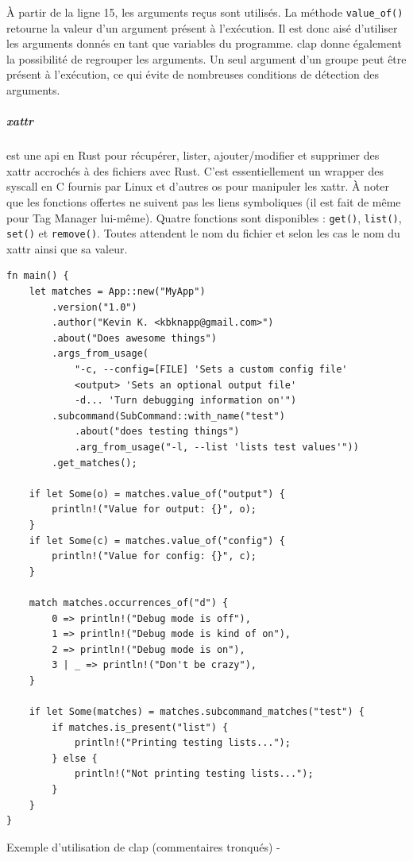 À partir de la ligne 15, les arguments reçus sont utilisés. La méthode \texttt{value_of()} 
retourne la valeur d'un argument présent à l'exécution. Il est donc aisé d'utiliser les arguments 
donnés en tant que variables du programme. clap donne également la possibilité de regrouper les 
arguments. Un seul argument d'un groupe peut être présent à l'exécution, ce qui évite de nombreuses 
conditions de détection des arguments.
\subparagraph{xattr}
est une \acrshort{api} 
en Rust pour récupérer, lister, ajouter/modifier et supprimer des \acrshort{xattr} accrochés à des 
fichiers avec Rust. C'est essentiellement un wrapper des \acrshort{syscall} en C fournis par Linux 
et d'autres \acrshort{os} pour manipuler les \acrshort{xattr}. À noter que les fonctions offertes ne 
suivent pas les liens symboliques (il est fait de même pour Tag Manager lui-même). Quatre fonctions 
sont disponibles : \texttt{get()}, \texttt{list()}, \texttt{set()} 
et \texttt{remove()}. Toutes attendent le nom du fichier et selon les cas le nom du 
\acrshort{xattr} ainsi que sa valeur.
\bigbreak
\begin{code}
    \begin{verbatim}
fn main() {
    let matches = App::new("MyApp")
        .version("1.0")
        .author("Kevin K. <kbknapp@gmail.com>")
        .about("Does awesome things")
        .args_from_usage(
            "-c, --config=[FILE] 'Sets a custom config file'
            <output> 'Sets an optional output file'
            -d... 'Turn debugging information on'")
        .subcommand(SubCommand::with_name("test")
            .about("does testing things")
            .arg_from_usage("-l, --list 'lists test values'"))
        .get_matches();

    if let Some(o) = matches.value_of("output") {
        println!("Value for output: {}", o);
    }
    if let Some(c) = matches.value_of("config") {
        println!("Value for config: {}", c);
    }

    match matches.occurrences_of("d") {
        0 => println!("Debug mode is off"),
        1 => println!("Debug mode is kind of on"),
        2 => println!("Debug mode is on"),
        3 | _ => println!("Don't be crazy"),
    }

    if let Some(matches) = matches.subcommand_matches("test") {
        if matches.is_present("list") {
            println!("Printing testing lists...");
        } else {
            println!("Not printing testing lists...");
        }
    }
}
    \end{verbatim}
    \caption{Exemple d'utilisation de clap (commentaires tronqués) - \cite{ref42}}
    \label{tag_manager_clap}
\end{code}
